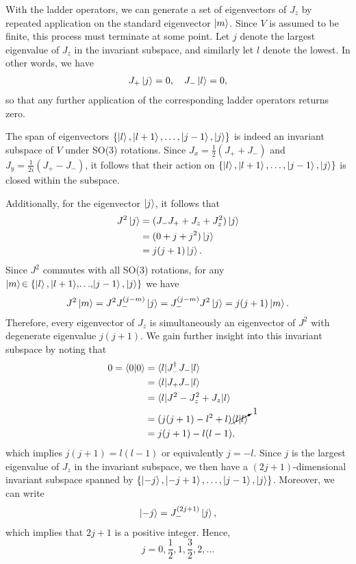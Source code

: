 With the ladder operators, we can generate a set of eigenvectors of $J_z$ by repeated application on the standard eigenvector $\ket{m}$. Since $V$ is assumed to be finite, this process must terminate at some point. Let $j$ denote the largest eigenvalue of $J_z$ in the invariant subspace, and similarly let $l$ denote the lowest. In other words, we have
\begin{align}
    J_+\ket{j} = 0, \quad J_-\ket{l} = 0,
\end{align}
so that any further application of the corresponding ladder operators returns zero.

The span of eigenvectors $\left\{ \ket{l}, \ket{l+1}, \dots, \ket{j-1}, \ket{j} \right\}$ is indeed an invariant subspace of $V$ under SO(3) rotations. Since $J_x = \frac{1}{2}(J_+ + J_-)$ and $J_y = \frac{1}{2i}(J_+ - J_-)$, it follows that their action on $\left\{ \ket{l}, \ket{l+1}, \dots, \ket{j-1}, \ket{j} \right\}$ is closed within the subspace.

Additionally, for the eigenvector $\ket{j}$, it follows that
\begin{align}
    \begin{split}        
    J^2\ket{j} &= (J_- J_+ + J_z + J_z^2 )\ket{j} \\
    &= (0 + j + j^2)\ket{j} \\
    &= j(j+1)\ket{j}.
    \end{split}
\end{align}
Since $J^2$ commutes with all SO(3) rotations, for any $\ket{m}\!\in\left\{ \ket{l}, \ket{l+1}\!,\! \dots\!,\!\ket{j-1}, \ket{j} \right\}$ we have
\begin{align}
    J^2\ket{m} = J^2 J_-^{(j-m)}\ket{j} = J_-^{(j-m)} J^2\ket{j} = j(j+1)\ket{m}.
\end{align}
Therefore, every eigenvector of $J_z$ is simultaneously an eigenvector of $J^2$ with degenerate eigenvalue $j(j+1)$. We gain further insight into this invariant subspace by noting that
\begin{align}
    \begin{split}        
    0 = \braket{0|0}
        &= \braket{l|J_-^\dagger J_-|l} \\
        &= \braket{l|J_+ J_-|l} \\
        &= \braket{l|J^2 - J_z^2 + J_z|l} \\
        &= (j(j+1) - l^2 + l)\cancelto{1}{\braket{l|l}} \\
        &= j(j+1) - l(l-1), \label{eq:ladder_eig}
    \end{split}
\end{align}
which implies $j(j+1) = l(l-1)$ or equivalently $j = -l$. Since $j$ is the largest eigenvalue of $J_z$ in the invariant subspace, we then have a $(2j+1)$-dimensional invariant subspace spanned by $\left\{ \ket{-j}, \ket{-j+1}, \dots, \ket{j-1}, \ket{j} \right\}$. Moreover, we can write
\begin{align}
    \ket{-j} = J_-^{(2j+1)}\ket{j},
\end{align}
which implies that $2j+1$ is a positive integer. Hence,
\begin{equation}
    j=0,\frac{1}{2},1,\frac{3}{2},2,\dots
\end{equation}

